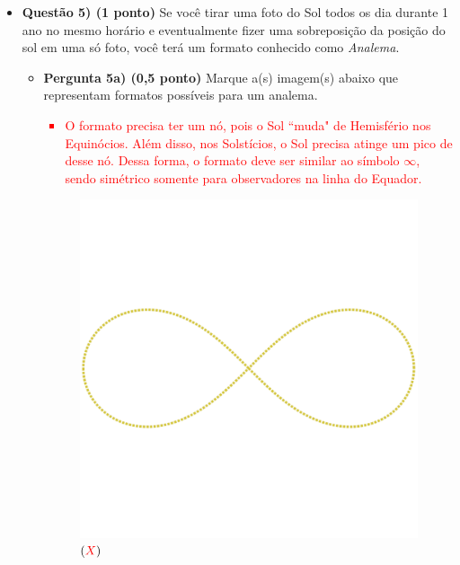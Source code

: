 \documentclass[a4paper, 12pt]{article}
\newcommand{\red}[1]{\textcolor{red}{#1}}
\begin{document}
\begin{flushleft}
\begin{itemize}
		\item \textbf{Questão 5) (1 ponto)} Se você tirar uma foto do Sol todos os dia durante 1 ano no mesmo horário e eventualmente fizer uma sobreposição da posição do sol em uma só foto, você terá um formato conhecido como \textit{Analema}.
			\begin{itemize}
				\item \textbf{Pergunta 5a) (0,5 ponto)} Marque a(s) imagem(s) abaixo que representam formatos possíveis para um analema.
					\red{\begin{itemize}
						\item O formato precisa ter um nó, pois o Sol ``muda" de Hemisfério nos Equinócios. Além disso, nos Solstícios, o Sol precisa atinge um pico de desse nó. Dessa forma, o formato deve ser similar ao símbolo $\infty$, sendo simétrico somente para observadores na linha do Equador.
					\end{itemize}}
					\begin{multicols}{2}
						\begin{figure}[H]
							\centering
							\includegraphics[scale=0.15]{./img/5a.png}
							\captionsetup{labelformat=empty}
							\caption{$(\red{X})$}
						\end{figure}
						\begin{figure}[H]
							\centering

\end{figure}
\end{multicols}
\end{itemize}
\end{itemize}
\end{flushleft}
\end{document}
